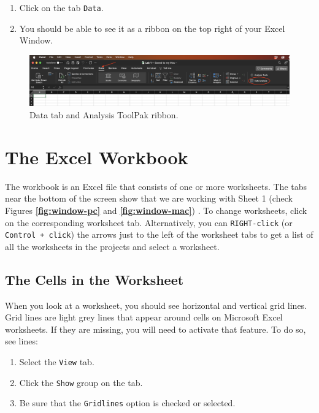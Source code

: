 \documentclass[
  12pt,
  letterpaper,
]{book}
\providecommand{\tightlist}{%
  \setlength{\itemsep}{0pt}\setlength{\parskip}{0pt}}
\begin{document}
\begin{enumerate}
\def\labelenumi{\arabic{enumi}.}
\tightlist
\item
  Click on the tab \texttt{Data}.
\item
  You should be able to see it as a ribbon on the top right of your Excel Window.
\end{enumerate}

\begin{figure}

{\centering \includegraphics[width=0.9\linewidth]{images/check_toolpak_mac} 

}

\caption{Data tab and Analysis ToolPak ribbon.}\label{fig:check-toolpak-mac}
\end{figure}

\hypertarget{workbook}{%
\section{The Excel Workbook}\label{workbook}}

The workbook is an Excel file that consists of one or more worksheets. The tabs near the bottom of the screen show that we are working with Sheet 1 (check Figures \textbf{\ref{fig:window-pc}} and \textbf{\ref{fig:window-mac}}) . To change worksheets, click on the corresponding worksheet tab. Alternatively, you can \texttt{RIGHT-click} (or \texttt{Control\ +\ click}) the arrows just to the left of the worksheet tabs to get a list of all the worksheets in the projects and select a worksheet.

\hypertarget{the-cells-in-the-worksheet}{%
\subsection{The Cells in the Worksheet}\label{the-cells-in-the-worksheet}}

When you look at a worksheet, you should see horizontal and vertical grid lines. Grid lines are light grey lines that appear around cells on Microsoft Excel worksheets. If they are missing, you will need to activate that feature. To do so, see lines:

\begin{enumerate}
\def\labelenumi{\arabic{enumi}.}
\tightlist
\item
  Select the \texttt{View} tab.
\item
  Click the \texttt{Show} group on the tab.
\item
  Be sure that the \texttt{Gridlines} option is checked or selected.
\end{enumerate}
\end{document}
